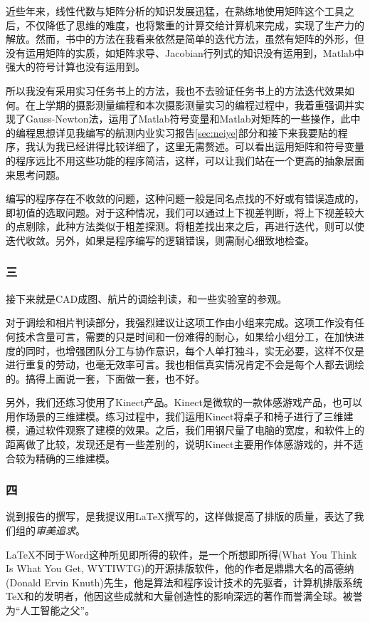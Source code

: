近些年来，线性代数与矩阵分析的知识发展迅猛，在熟练地使用矩阵这个工具之后，不仅降低了思维的难度，也将繁重的计算交给计算机来完成，实现了生产力的解放。然而，书中的方法在我看来依然是简单的迭代方法，虽然有矩阵的外形，但没有运用矩阵的实质，如矩阵求导、Jacobian行列式的知识没有运用到，Matlab中强大的符号计算也没有运用到。

所以我没有采用实习任务书上的方法，我也不去验证任务书上的方法迭代效果如何。在上学期的摄影测量编程和本次摄影测量实习的编程过程中，我着重强调并实现了Gauss-Newton法，运用了Matlab符号变量和Matlab对矩阵的一些操作，此中的编程思想详见我编写的航测内业实习报告\ref{sec:neiye}部分和接下来我要贴的程序，我认为我已经讲得比较详细了，这里无需赘述。可以看出运用矩阵和符号变量的程序远比不用这些功能的程序简洁，这样，可以让我们站在一个更高的抽象层面来思考问题。

编写的程序存在不收敛的问题，这种问题一般是同名点找的不好或有错误造成的，即初值的选取问题。对于这种情况，我们可以通过上下视差判断，将上下视差较大的点剔除，此种方法类似于粗差探测。将粗差找出来之后，再进行迭代，则可以使迭代收敛。另外，如果是程序编写的逻辑错误，则需耐心细致地检查。


\subsubsection{三}

接下来就是CAD成图、航片的调绘判读，和一些实验室的参观。

对于调绘和相片判读部分，我强烈建议让这项工作由小组来完成。这项工作没有任何技术含量可言，需要的只是时间和一份难得的耐心，如果给小组分工，在加快进度的同时，也增强团队分工与协作意识，每个人单打独斗，实无必要，这样不仅是进行重复的劳动，也毫无效率可言。我也相信真实情况肯定不会是每个人都去调绘的。搞得上面说一套，下面做一套，也不好。

另外，我们还练习使用了Kinect产品。Kinect是微软的一款体感游戏产品，也可以用作场景的三维建模。练习过程中，我们运用Kinect将桌子和椅子进行了三维建模，通过软件观察了建模的效果。之后，我们用钢尺量了电脑的宽度，和软件上的距离做了比较，发现还是有一些差别的，说明Kinect主要用作体感游戏的，并不适合较为精确的三维建模。


\subsubsection{四}

说到报告的撰写，是我提议用\LaTeX{}撰写的，这样做提高了排版的质量，表达了我们组的\emph{审美追求}。

\LaTeX{}不同于Word这种所见即所得的软件，是一个所想即所得(What You Think Is What You Get, WYTIWTG)的开源排版软件，他的作者是鼎鼎大名的高德纳(Donald Ervin Knuth)先生，他是算法和程序设计技术的先驱者，计算机排版系统\TeX{}和\MF 的发明者，他因这些成就和大量创造性的影响深远的著作而誉满全球。被誉为“人工智能之父”。


